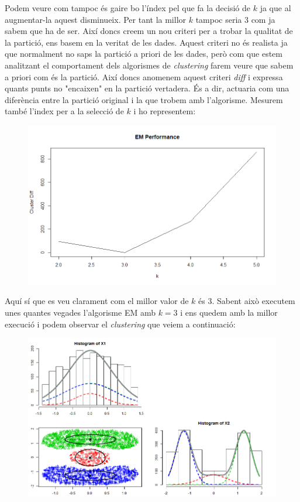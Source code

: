 \documentclass[a4paper]{article}
\begin{document}
\begin{enumerate}
 Podem veure com tampoc és gaire bo l'índex pel que fa la decisió de $k$ ja que al augmentar-la aquest disminueix. Per tant la millor $k$ tampoc seria 3 com ja sabem que ha de ser. Així doncs creem un nou criteri per a trobar la qualitat de la partició, ens basem en la veritat de les dades. Aquest criteri no és realista ja que normalment no saps la partició a priori de les dades, però com que estem analitzant el comportament dels algorismes de \textit{clustering} farem veure que sabem a priori com és la partició. Així doncs anomenem aquest criteri \textit{diff} i expressa quants punts no "encaixen" en la partició vertadera. És a dir, actuaria com una diferència entre la partició original i la que trobem amb l'algorisme. Mesurem també l'index per a la selecció de $k$ i ho representem:
 
  	\begin{figure}[H]
 	\centering
 	\includegraphics[scale=0.5]{DifPerf}
 \end{figure}

Aquí sí que es veu clarament com el millor valor de $k$ és 3. Sabent això executem unes quantes vegades l'algorisme EM amb $k=3$ i ens quedem amb la millor execució i podem observar el \textit{clustering} que veiem a continuació:

 	\begin{figure}[H]
	\centering
	\includegraphics[scale=0.5]{diffResult}
	\end{figure}
 

\end{enumerate}
\end{document}
